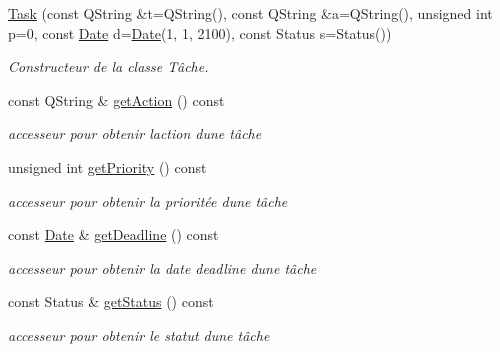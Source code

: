 \begin{DoxyCompactItemize}
\item 
\hyperlink{class_task_a848131e6d6b7132cb77d636a3e2794c7}{Task} (const Q\+String \&t=Q\+String(), const Q\+String \&a=Q\+String(), unsigned int p=0, const \hyperlink{class_date}{Date} d=\hyperlink{class_date}{Date}(1, 1, 2100), const Status s=Status())
\begin{DoxyCompactList}\small\item\em Constructeur de la classe Tâche. \end{DoxyCompactList}\item 
\mbox{\label{class_task_a90e80d51eae7ed6235497cd53a1f4930}} 
const Q\+String \& \hyperlink{class_task_a90e80d51eae7ed6235497cd53a1f4930}{get\+Action} () const
\begin{DoxyCompactList}\small\item\em accesseur pour obtenir l\textquotesingle{}action d\textquotesingle{}une tâche \end{DoxyCompactList}\item 
\mbox{\label{class_task_a1f685a6b0201fd10d576e3b57ada937e}} 
unsigned int \hyperlink{class_task_a1f685a6b0201fd10d576e3b57ada937e}{get\+Priority} () const
\begin{DoxyCompactList}\small\item\em accesseur pour obtenir la prioritée d\textquotesingle{}une tâche \end{DoxyCompactList}\item 
\mbox{\label{class_task_ab14cae63f329fae9a6db8257fb7b051c}} 
const \hyperlink{class_date}{Date} \& \hyperlink{class_task_ab14cae63f329fae9a6db8257fb7b051c}{get\+Deadline} () const
\begin{DoxyCompactList}\small\item\em accesseur pour obtenir la date deadline d\textquotesingle{}une tâche \end{DoxyCompactList}\item 
\mbox{\label{class_task_a02289a96ff470980ee371f822e71f125}} 
const Status \& \hyperlink{class_task_a02289a96ff470980ee371f822e71f125}{get\+Status} () const
\begin{DoxyCompactList}\small\item\em accesseur pour obtenir le statut d\textquotesingle{}une tâche \end{DoxyCompactList}\item 

\end{DoxyCompactItemize}
